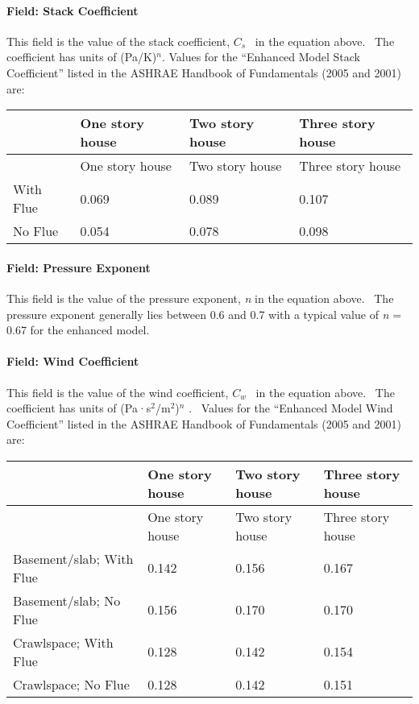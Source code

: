 \paragraph{Field: Stack Coefficient}\label{field-stack-coefficient-1}

This field is the value of the stack coefficient, \({C_s}\) ~in the equation above.~ The coefficient has units of (Pa/K)\(^{n}\). Values for the ``Enhanced Model Stack Coefficient'' listed in the ASHRAE Handbook of Fundamentals (2005 and 2001) are:

\begin{longtable}[c]{@{}llll@{}}
\toprule 
~ & One story house & Two story house & Three story house \tabularnewline
\midrule
\endfirsthead

\toprule 
~ & One story house & Two story house & Three story house \tabularnewline
\midrule
\endhead

With Flue & 0.069 & 0.089 & 0.107 \tabularnewline
No Flue & 0.054 & 0.078 & 0.098 \tabularnewline
\bottomrule
\end{longtable}

\paragraph{Field: Pressure Exponent}\label{field-pressure-exponent}

This field is the value of the pressure exponent, \emph{n} in the equation above.~ The pressure exponent generally lies between 0.6 and 0.7 with a typical value of \emph{n} = 0.67 for the enhanced model.

\paragraph{Field: Wind Coefficient}\label{field-wind-coefficient-1}

This field is the value of the wind coefficient, \({C_w}\) ~in the equation above.~ The coefficient has units of (Pa·s\(^{2}\)/m\(^{2}\))\(^{n}\) .~ Values for the ``Enhanced Model Wind Coefficient'' listed in the ASHRAE Handbook of Fundamentals (2005 and 2001) are:

\begin{longtable}[c]{p{1.5in}p{1.5in}p{1.5in}p{1.5in}}
\toprule 
~ & One story house & Two story house & Three story house \tabularnewline
\midrule
\endfirsthead

\toprule 
~ & One story house & Two story house & Three story house \tabularnewline
\midrule
\endhead

Basement/slab; With Flue & 0.142 & 0.156 & 0.167 \tabularnewline
Basement/slab; No Flue & 0.156 & 0.170 & 0.170 \tabularnewline
Crawlspace; With Flue & 0.128 & 0.142 & 0.154 \tabularnewline
Crawlspace; No Flue & 0.128 & 0.142 & 0.151 \tabularnewline
\bottomrule
\end{longtable}

